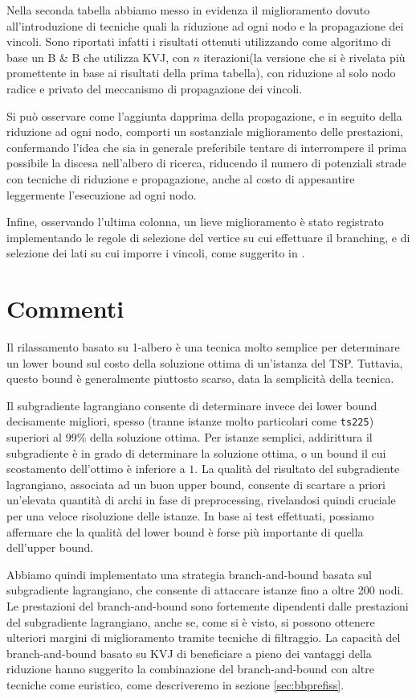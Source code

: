 Nella seconda tabella abbiamo messo in evidenza il miglioramento dovuto all'introduzione di tecniche quali la riduzione ad ogni nodo e la propagazione dei vincoli. Sono riportati infatti i risultati ottenuti utilizzando come algoritmo di base un B \& B che utilizza KVJ, con $n$ iterazioni(la versione che si è rivelata più promettente in base ai risultati della prima tabella), con riduzione al solo nodo radice e privato del meccanismo di propagazione dei vincoli.
 
Si può osservare come l'aggiunta dapprima della propagazione, e in seguito della riduzione ad ogni nodo, comporti un sostanziale miglioramento delle prestazioni, confermando l'idea che sia in generale preferibile tentare di interrompere il prima possibile la discesa nell'albero di ricerca, riducendo il numero di potenziali strade con tecniche di riduzione e propagazione, anche al costo di appesantire leggermente l'esecuzione ad ogni nodo.

Infine, osservando l'ultima colonna, un lieve miglioramento è stato registrato implementando le regole di selezione del vertice su cui effettuare il branching, e di selezione dei lati su cui imporre i vincoli, come suggerito in \citep{volgenant1982branch}. 

\section{Commenti}
Il rilassamento basato su 1-albero è una tecnica molto semplice per determinare un lower bound sul costo della soluzione ottima di un'istanza del TSP. Tuttavia, questo bound è generalmente piuttosto scarso, data la semplicità della tecnica.

Il subgradiente lagrangiano consente di determinare invece dei lower bound decisamente migliori, spesso (tranne istanze molto particolari come \texttt{ts225}) superiori al 99\% della soluzione ottima. Per istanze semplici, addirittura il subgradiente è in grado di determinare la soluzione ottima, o un bound il cui scostamento dell'ottimo è inferiore a $1$. La qualità del risultato del subgradiente lagrangiano, associata ad un buon upper bound, consente di scartare a priori un'elevata quantità di archi in fase di preprocessing, rivelandosi quindi cruciale per una veloce risoluzione delle istanze. In base ai test effettuati, possiamo  affermare che la qualità del lower bound è forse più importante di quella dell'upper bound.

Abbiamo quindi implementato una strategia branch-and-bound basata sul subgradiente lagrangiano, che consente di attaccare istanze fino a oltre 200 nodi. Le prestazioni del branch-and-bound sono fortemente dipendenti dalle prestazioni del subgradiente lagrangiano, anche se, come si è visto, si possono ottenere ulteriori margini di miglioramento tramite tecniche di filtraggio. La capacità del branch-and-bound basato su KVJ di beneficiare a pieno dei vantaggi della riduzione hanno suggerito la combinazione del branch-and-bound con altre tecniche come euristico, come descriveremo in sezione \ref{sec:bbprefiss}.
